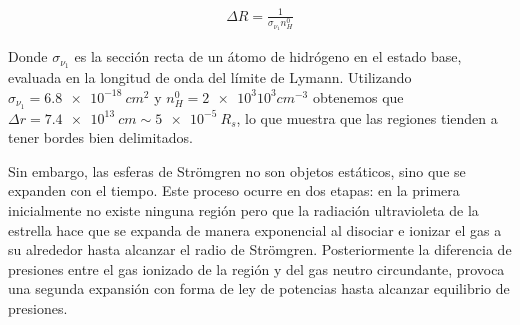 \begin{align}
\Delta R = \frac{1}{\sigma_{\nu_1}n^0_H}  
\end{align}

Donde $\sigma_{\nu_1}$ es la sección recta de un átomo de hidrógeno en el estado base, evaluada en la longitud de onda del límite de Lymann. Utilizando $\sigma_{\nu_1} = \SI{6.8e-18}{cm^2}$ y $n^0_H = \SI{2e3} 10^{3}{cm^{-3}}$ obtenemos que $\Delta r = \SI{7.4e13}{cm} \sim \SI{5e-5}{R_s}$, lo que muestra que las regiones  tienden a tener bordes bien delimitados.

Sin embargo, las esferas de Strömgren no son objetos estáticos, sino que se expanden con el tiempo. Este proceso ocurre en dos etapas: en la primera inicialmente no existe ninguna región  pero que la radiación ultravioleta de la estrella hace que se expanda de manera exponencial al disociar e ionizar el gas a su alrededor hasta alcanzar el radio de Strömgren. Posteriormente la diferencia de presiones entre el gas ionizado de la región  y del gas neutro circundante, provoca una segunda expansión con forma de ley de potencias hasta alcanzar equilibrio de presiones.





